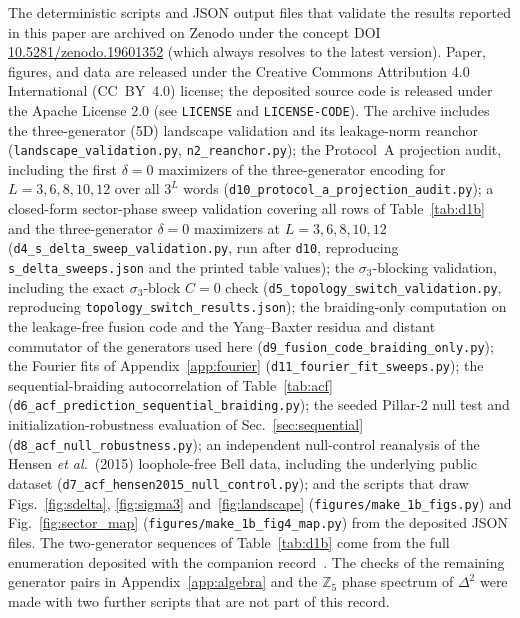 \documentclass[aps,pra,twocolumn,superscriptaddress,longbibliography,floatfix,nofootinbib]{revtex4-2}
\begin{document}
The deterministic scripts and JSON output files that validate the
results reported in this paper are archived on Zenodo under the
concept DOI
\href{https://doi.org/10.5281/zenodo.19601352}{10.5281/zenodo.19601352}
(which always resolves to the latest version). Paper, figures, and data are released
under the Creative Commons Attribution 4.0 International (CC~BY~4.0)
license; the deposited source code is released under the Apache License 2.0
(see \texttt{LICENSE} and \texttt{LICENSE-CODE}).
The archive includes the three-generator (5D) landscape validation
and its leakage-norm reanchor (\texttt{landscape\_validation.py},
\texttt{n2\_reanchor.py}); the Protocol~A projection audit, including
the first $\delta = 0$ maximizers of the three-generator encoding for
$L = 3, 6, 8, 10, 12$ over all $3^L$ words
(\texttt{d10\_protocol\_a\_projection\_audit.py}); a closed-form
sector-phase sweep validation covering all rows of
Table~\ref{tab:d1b} and the three-generator $\delta = 0$ maximizers at
$L = 3, 6, 8, 10, 12$
(\texttt{d4\_s\_delta\_sweep\_validation.py}, run after \texttt{d10},
reproducing \texttt{s\_delta\_sweeps.json} and the printed table
values); the $\sigma_3$-blocking validation, including the exact
$\sigma_3$-block $C=0$ check (\texttt{d5\_topology\_switch\_validation.py},
reproducing \texttt{topology\_switch\_results.json}); the braiding-only
computation on the leakage-free fusion code and the Yang--Baxter
residua and distant commutator of the generators used here
(\texttt{d9\_fusion\_code\_braiding\_only.py}); the Fourier fits of
Appendix~\ref{app:fourier} (\texttt{d11\_fourier\_fit\_sweeps.py}); the
sequential-braiding autocorrelation of Table~\ref{tab:acf}
(\texttt{d6\_acf\_prediction\_sequential\_braiding.py}); the seeded
Pillar-2 null test and initialization-robustness evaluation of
Sec.~\ref{sec:sequential} (\texttt{d8\_acf\_null\_robustness.py}); an
independent null-control reanalysis of the Hensen \emph{et al.}\
(2015) loophole-free Bell data, including the underlying public
dataset (\texttt{d7\_acf\_hensen2015\_null\_control.py}); and the
scripts that draw Figs.~\ref{fig:sdelta}, \ref{fig:sigma3}
and~\ref{fig:landscape} (\texttt{figures/make\_1b\_figs.py}) and
Fig.~\ref{fig:sector_map} (\texttt{figures/make\_1b\_fig4\_map.py}) from
the deposited JSON files. The two-generator sequences of
Table~\ref{tab:d1b} come from the full enumeration deposited with the
companion record~\cite{Sayim2026topological}. The checks of the
remaining generator pairs in Appendix~\ref{app:algebra} and the
$\mathbb{Z}_5$ phase spectrum of $\Delta^2$ were made with two further
scripts that are not part of this record.
\end{document}

